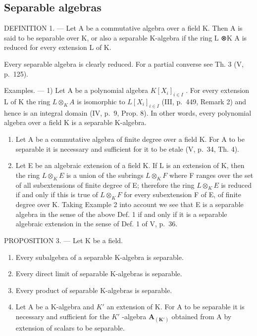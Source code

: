 \subsection{Separable algebras}

DEFINITION 1. --- Let A be a commutative algebra over a field K. Then A is said to be separable over K, or also a separable K-algebra if the ring L ⊗K A is reduced for every extension L of K.

Every separable algebra is clearly reduced. For a partial converse see Th. 3 (V, p.~125).

Examples. --- 1) Let A be a polynomial algebra \(K[X_{i}]_{i \in I}\) . For every extension L of K the ring \(L \otimes_{K} A\) is isomorphic to \(L[X_{i}]_{i \in I}\) (III, p.~449, Remark 2) and hence is an integral domain (IV, p.~9, Prop. 8). In other words, every polynomial algebra over a field K is a separable K-algebra.

\begin{enumerate}
\def\labelenumi{\arabic{enumi})}
\setcounter{enumi}{1}
\item
  Let A be a commutative algebra of finite degree over a field K. For A to be separable it is necessary and sufficient for it to be etale (V, p.~34, Th. 4).
\item
  Let E be an algebraic extension of a field K. If L is an extension of K, then the ring \(L \otimes_{K} E\) is a union of the subrings \(L \otimes_{K} F\) where F ranges over the set of all subextensions of finite degree of E; therefore the ring \(L \otimes_{K} E\) is reduced if and only if this is true of \(L \otimes_{K} F\) for every subextension F of E, of finite degree over K. Taking Example 2 into account we see that E is a separable algebra in the sense of the above Def. 1 if and only if it is a separable algebraic extension in the sense of Def. 1 of V, p.~36.
\end{enumerate}

PROPOSITION 3. --- Let K be a field.

\begin{enumerate}
\def\labelenumi{\alph{enumi})}
\item
  Every subalgebra of a separable K-algebra is separable.
\item
  Every direct limit of separable K-algebras is separable.
\item
  Every product of separable K-algebras is separable.
\item
  Let A be a K-algebra and \(K'\) an extension of K. For A to be separable it is necessary and sufficient for the \(K'\) -algebra \(\mathbf{A}_{(\mathbf{K}')}\) obtained from A by extension of scalars to be separable.
\end{enumerate}

